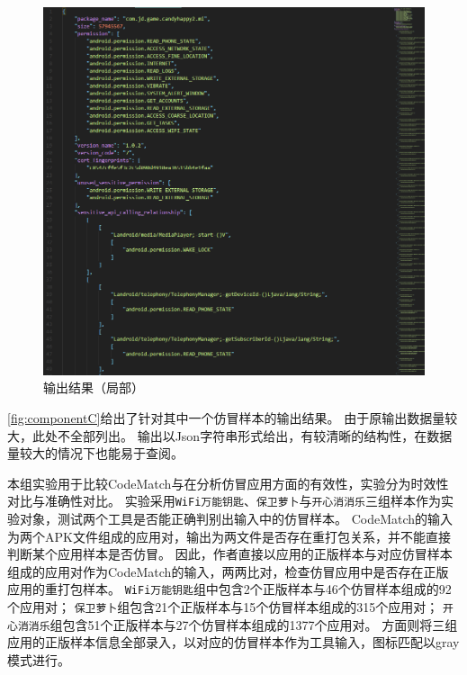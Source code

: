 \begin{figure}[ht]
    \centering
    \includegraphics[width=\textwidth]{./Figures/edwin-component-C.jpg}
    \caption{\componentC 输出结果（局部）}
    \label{fig:componentC}
    \vspace{-3mm}
\end{figure}

\autoref{fig:componentC}给出了\componentC 针对其中一个仿冒样本的输出结果。
由于原输出数据量较大，此处不全部列出。
输出以Json字符串形式给出，有较清晰的结构性，在数据量较大的情况下也能易于查阅。



本组实验用于比较CodeMatch与\mytool 在分析仿冒应用方面的有效性，实验分为时效性对比与准确性对比。
实验采用\texttt{WiFi万能钥匙}、\texttt{保卫萝卜}与\texttt{开心消消乐}三组样本作为实验对象，测试两个工具是否能正确判别出输入中的仿冒样本。
CodeMatch的输入为两个APK文件组成的应用对，输出为两文件是否存在重打包关系，并不能直接判断某个应用样本是否仿冒。
因此，作者直接以应用的正版样本与对应仿冒样本组成的应用对作为CodeMatch的输入，两两比对，检查仿冒应用中是否存在正版应用的重打包样本。
\texttt{WiFi万能钥匙}组中包含2个正版样本与46个仿冒样本组成的92个应用对；
\texttt{保卫萝卜}组包含21个正版样本与15个仿冒样本组成的315个应用对；
\texttt{开心消消乐}组包含51个正版样本与27个仿冒样本组成的1377个应用对。
\mytool 方面则将三组应用的正版样本信息全部录入\componentD ，以对应的仿冒样本作为工具输入，图标匹配以gray模式进行。

